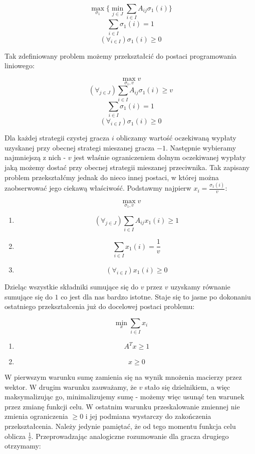\documentclass[polish]{standalone}
\begin{document}
$$\max_{\sigma_1} \{ \min_{j \in J} \sum_{i \in I} A_{ij} \sigma_1(i) \}$$
$$\sum_{i \in I} \sigma_1(i) = 1$$
$$(\forall_{i \in I}) \sigma_1(i) \geq 0$$

Tak zdefiniowany problem możemy przekształcić do postaci programowania liniowego:

$$\max_{\sigma_1,v} v$$
$$(\forall_{j \in J}) \sum_{i \in I} A_{ij} \sigma_1(i) \geq v$$
$$\sum_{i \in I} \sigma_1(i) = 1$$
$$(\forall_{i \in I}) \sigma_1(i) \geq 0$$

Dla każdej strategii czystej gracza $i$ obliczamy wartość oczekiwaną wypłaty uzyskanej przy obecnej strategi mieszanej
gracza $-1$. Następnie wybieramy najmniejszą z nich - $v$ jest właśnie ograniczeniem dolnym oczekiwanej wypłaty jaką
możemy dostać przy obecnej strategii mieszanej przeciwnika. Tak zapisany problem przekształćmy jednak do nieco innej
postaci, w której można zaobserwować jego ciekawą właściwość. Podstawmy najpierw $x_i = \frac{\sigma_1(i)}{v}$:

$$\max_{\sigma_1,v} v$$
\begin{enumerate}
\item $$(\forall_{j \in J}) \sum_{i \in I} A_{ij} x_1(i) \geq 1$$
\item $$\sum_{i \in I} x_1(i) = \frac{1}{v}$$
\item $$(\forall_{i \in I}) x_1(i) \geq 0$$
\end{enumerate}

Dzieląc wszystkie składniki sumujące się do $v$ przez $v$ uzyskamy równanie sumujące się do $1$ co jest dla nas bardzo
istotne. Staje się to jasne po dokonaniu ostatniego przekształcenia już do docelowej postaci problemu:

$$\min_x \sum_{i \in I} x_i$$
\begin{enumerate}
\item $$A^Tx \geq 1$$
\item $$x \geq 0$$
\end{enumerate}

W pierwszym warunku sumę zamienia się na wynik mnożenia macierzy przez wektor. W drugim warunku zauważamy, że $v$ stało
się dzielnikiem, a więc maksymalizując go, minimalizujemy sumę - możemy więc usunąć ten warunek przez zmianę funkcji
celu. W ostatnim warunku przeskalowanie zmiennej nie zmienia ograniczenia $\geq 0$ i jej podmiana wystarczy do
zakończenia przekształcenia. Należy jedynie pamiętać, że od tego momentu funkcja celu oblicza $\frac{1}{v}$.
Przeprowadzając analogiczne rozumowanie dla gracza drugiego otrzymamy:
\end{document}
